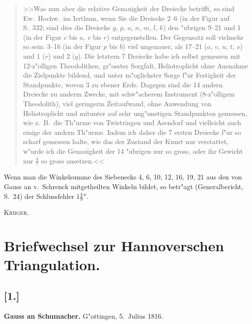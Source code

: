 \documentclass[12pt,a4paper]{article}
\theoremstyle{plain}
\theoremstyle{definition}
\theoremstyle{remark}
\begin{document}
\begin{quote}
>>Was nun aber die relative Genauigkeit der Dreiecke betrifft, so sind Ew.\ Hochw.\ im Irrthum, wenn Sie die Dreiecke 2--6 (in der Figur auf S.~332; sind dies die Dreiecke $g$, $p$, $o$, $n$, $m$, $l$, $k$) den "ubrigen 9--21 und 1 (in der Figur $c$ bis $a$, $v$ bis $r$) entgegenstellen. Der Gegensatz soll vielmehr so sein: 3--16 (in der Figur $p$ bis $b$) viel ungenauer, als 17--21 ($a$, $v$, $u$, $t$, $s$) und 1 ($r$) und 2 ($q$). Die letztern 7 Dreiecke habe ich selbst gemessen mit 12-z"olligen Theodolithen, gr"osster Sorgfalt, Heliotroplicht ohne Ausnahme die Zielpunkte bildend, und unter m"oglichster Sorge f"ur Festigkeit der Standpunkte, wovon 3 zu ebener Erde. Dagegen sind die 14 andern Dreiecke zu anderm Zwecke, mit schw"acherem Instrument (8-z"olligem Theodolith), viel geringerm Zeitaufwand, ohne Anwendung von Heliotroplicht und mitunter auf sehr ung"unstigen Standpunkten gemessen, wie z.~B.\ die Th"urme von Twistringen und Asendorf und vielleicht auch einige der andern Th"urme. Indem ich daher die 7 ersten Dreiecke f"ur so scharf gemessen halte, wie das der Zustand der Kunst nur verstattet, w"urde ich die Genauigkeit der 14 "ubrigen nur so gross, oder ihr Gewicht nur $\frac{4}{7}$ so gross ansetzen.<<
\end{quote}

Wenn man die Winkelsumme des Siebenecks 4, 6, 10, 12, 16, 19, 21 aus den von Gauss an v.~Schrenck mitgetheilten Winkeln bildet, so betr"agt (Generalbericht, S.~24) der Schlussfehler $1\frac{4}{9}''$.

\begin{flushright}
\textsc{Kriiger.}
\end{flushright}

\newpage
\section*{Briefwechsel zur Hannoverschen Triangulation.}

\subsection*{[1.]}

\textbf{Gauss an Schumacher.} G"ottingen, 5.~Julius 1816.
\end{document}

